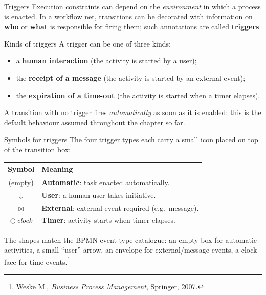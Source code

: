 \begin{definitionbox}{Triggers}
Execution constraints can depend on the \emph{environment} in which a process is enacted. In a workflow net, transitions can be decorated with information on \textbf{who} or \textbf{what} is responsible for firing them; such annotations are called \textbf{triggers}.
\end{definitionbox}



\begin{notebox}{Kinds of triggers}
A trigger can be one of three kinds:
\begin{itemize}
  \item a \textbf{human interaction} (the activity is started by a user);
  \item the \textbf{receipt of a message} (the activity is started by an external event);
  \item the \textbf{expiration of a time-out} (the activity is started when a timer elapses).
\end{itemize}
A transition with no trigger fires \emph{automatically} as soon as it is enabled: this is the default behaviour assumed throughout the chapter so far.
\end{notebox}

\begin{notebox}{Symbols for triggers}
The four trigger types each carry a small icon placed on top of the transition box:

\medskip

\begin{center}
\begin{tabular}{cl}
\toprule
\textbf{Symbol} & \textbf{Meaning} \\
\midrule
(empty)        & \textbf{Automatic}: task enacted automatically. \\
$\downarrow$   & \textbf{User}: a human user takes initiative. \\
$\boxtimes$    & \textbf{External}: external event required (e.g.\ message). \\
$\bigcirc$\,\textit{clock} & \textbf{Timer}: activity starts when timer elapses. \\
\bottomrule
\end{tabular}
\end{center}

The shapes match the BPMN event-type catalogue: an empty box for automatic activities, a small ``user'' arrow, an envelope for external/message events, a clock face for time events.\footnote{Weske M., \emph{Business Process Management}, Springer, 2007.}
\end{notebox}

